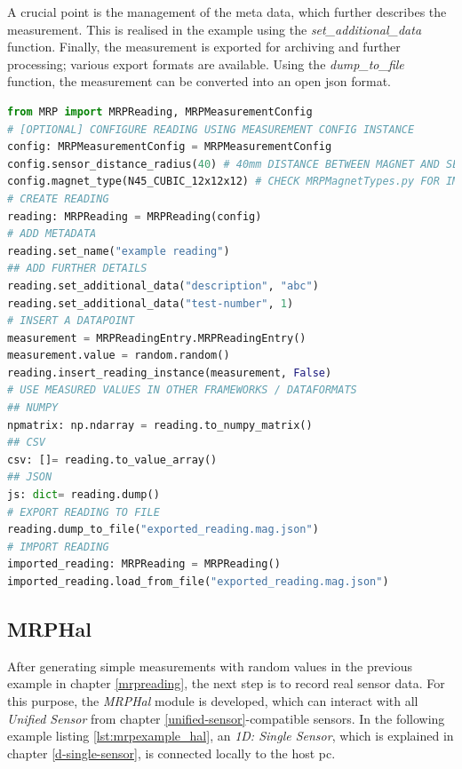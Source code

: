 A crucial point is the management of the meta data, which further
describes the measurement. This is realised in the example using the
\emph{set\_additional\_data} function. Finally, the measurement is
exported for archiving and further processing; various export formats
are available. Using the \emph{dump\_to\_file} function, the measurement
can be converted into an open \gls{json} format.

\begin{lstlisting}[language=Python, caption={MRPReading example for setting up a basic measurement using Python code}, label=lst:mrpexample_reading]
from MRP import MRPReading, MRPMeasurementConfig
# [OPTIONAL] CONFIGURE READING USING MEASUREMENT CONFIG INSTANCE
config: MRPMeasurementConfig = MRPMeasurementConfig
config.sensor_distance_radius(40) # 40mm DISTANCE BETWEEN MAGNET AND SENSOR
config.magnet_type(N45_CUBIC_12x12x12) # CHECK MRPMagnetTypes.py FOR IMPLEMENTED TYPES
# CREATE READING
reading: MRPReading = MRPReading(config)
# ADD METADATA
reading.set_name("example reading")
## ADD FURTHER DETAILS
reading.set_additional_data("description", "abc")
reading.set_additional_data("test-number", 1)
# INSERT A DATAPOINT
measurement = MRPReadingEntry.MRPReadingEntry()
measurement.value = random.random()
reading.insert_reading_instance(measurement, False)
# USE MEASURED VALUES IN OTHER FRAMEWORKS / DATAFORMATS
## NUMPY
npmatrix: np.ndarray = reading.to_numpy_matrix()
## CSV
csv: []= reading.to_value_array()
## JSON
js: dict= reading.dump()
# EXPORT READING TO FILE
reading.dump_to_file("exported_reading.mag.json")
# IMPORT READING
imported_reading: MRPReading = MRPReading()
imported_reading.load_from_file("exported_reading.mag.json")
\end{lstlisting}

\hypertarget{mrphal}{%
\subsection{MRPHal}\label{mrphal}}

After generating simple measurements with random values in the previous
example in chapter \ref{mrpreading}, the next step is to record real
sensor data. For this purpose, the \emph{MRPHal} module is developed,
which can interact with all \emph{Unified Sensor} from chapter
\ref{unified-sensor}-compatible sensors. In the following example
listing \ref{lst:mrpexample_hal}, an \emph{1D: Single Sensor}, which is
explained in chapter \ref{d-single-sensor}, is connected locally to the
host \gls{pc}.

